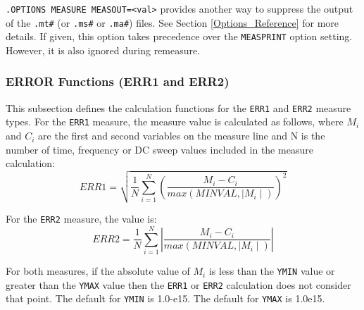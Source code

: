 \texttt{.OPTIONS MEASURE MEASOUT=<val>} provides another way to suppress the output
of the \texttt{.mt\#} (or \texttt{.ms\#} or \texttt{.ma\#}) files.
See Section \ref{Options_Reference} for more details.  If given, this
option takes precedence over the \texttt{MEASPRINT} option setting.
However, it is also ignored during remeasure.

\subsubsection{ERROR Functions (ERR1 and ERR2)}
\label{Measure_Error_Functions}
This subsection defines the calculation functions for the \texttt{ERR1} and
\texttt{ERR2} measure types.  For the \texttt{ERR1} measure, the measure
value is calculated as follows, where $M_i$ and $C_i$ are the first and
second variables on the measure line and N is the number of time, frequency
or DC sweep values included in the measure calculation:
\begin{equation}
ERR1 = \sqrt{ \frac{1}{N}\sum_{i=1}^{N} \left(\frac{M_i - C_i}{max(MINVAL,\mid M_i \mid)}\right)^2}
\end{equation}

For the \texttt{ERR2} measure, the value is:
\begin{equation}
ERR2 = \frac{1}{N}\sum_{i=1}^{N} \left|\frac{M_i - C_i}{max(MINVAL,\mid M_i \mid)}\right|
\end{equation}

For both measures, if the absolute value of $M_i$ is less than the
\texttt{YMIN} value or greater than the \texttt{YMAX} value then the
{\tt ERR1} or {\tt ERR2} calculation does not consider that point. The
default for \texttt{YMIN} is 1.0-e15.  The default for \texttt{YMAX}
is 1.0e15.

